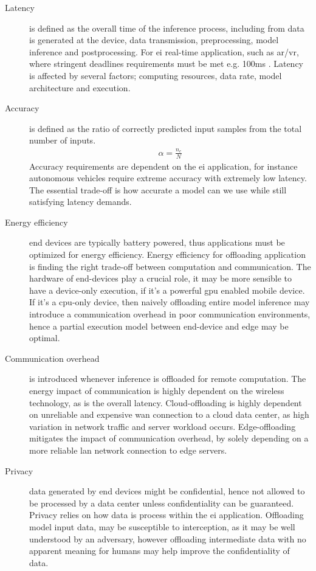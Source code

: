 \begin{description}
	\item[Latency] is defined as the overall time of the inference process, including from data is generated at the device, data transmission, preprocessing, model inference and postprocessing. For \gls{ei} real-time application, such as \gls{ar}/\gls{vr}, where stringent deadlines requirements must be met e.g. 100ms \cite{bibid}. Latency is affected by several factors; computing resources, data rate, model architecture and execution.
	
	\item[Accuracy] is defined as the ratio of correctly predicted input samples from the total number of inputs. 
	\begin{align*}
		\alpha = \frac{n_c}{N}
	\end{align*}
	Accuracy requirements are dependent on the \gls{ei} application, for instance autonomous vehicles require extreme accuracy with extremely low latency. The essential trade-off is how accurate a model can we use while still satisfying latency demands.  
	
	\item[Energy efficiency] end devices are typically battery powered, thus applications must be optimized for energy efficiency. Energy efficiency for offloading application is finding the right trade-off between computation and communication. The hardware of end-devices play a crucial role, it may be more sensible to have a device-only execution, if it's a powerful \gls{gpu} enabled mobile device. If it's a \gls{cpu}-only device, then naively offloading entire model inference may introduce a communication overhead in poor communication environments, hence a partial execution model between end-device and edge may be optimal. 
	
	\item[Communication overhead] is introduced whenever inference is offloaded for remote computation. The energy impact of communication is highly dependent on the wireless technology, as is the overall latency. Cloud-offloading is highly dependent on unreliable and expensive \gls{wan} connection to a cloud data center, as high variation in network traffic and server workload occurs. Edge-offloading mitigates the impact of communication overhead, by solely depending on a more reliable \gls{lan} network connection to edge servers.  
	 
	\item[Privacy] data generated by end devices might be confidential, hence not allowed to be processed by a data center unless confidentiality can be guaranteed. Privacy relies on how data is process within the \gls{ei} application. Offloading model input data, may be susceptible to interception, as it may be well understood by an adversary, however offloading intermediate data with no apparent meaning for humans may help improve the confidentiality of data.    
	

\end{description}
